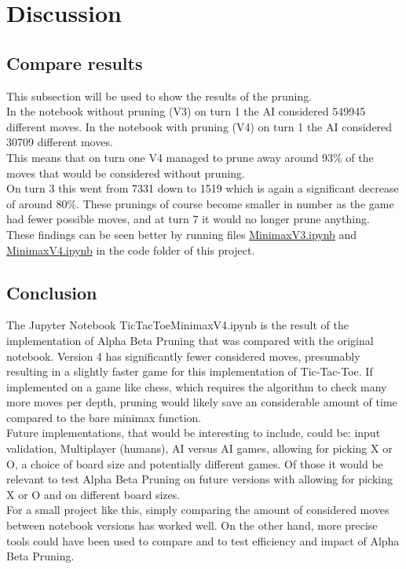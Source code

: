 \section{Discussion} 
\label{sec:Discussion}

\subsection{Compare results}
This subsection will be used to show the results of the pruning.\\
In the notebook without pruning (V3) on turn 1 the AI considered 549945 different moves.
In the notebook with pruning (V4) on turn 1 the AI considered 30709 different moves.\\
This means that on turn one V4 managed to prune away around 93\% of the moves that would be considered without pruning.\\
On turn 3 this went from 7331 down to 1519 which is again a significant decrease of around 80\%.
These prunings of course become smaller in number as the game had fewer possible moves, and at turn 7 it would no longer prune anything.\\
These findings can be seen better by running files \href{code/TicTacToe_MinimaxV3.ipynb}{MinimaxV3.ipynb} 
and \href{code/TicTacToe_MinimaxV4.ipynb}{MinimaxV4.ipynb} in the code folder of this project.

\subsection{Conclusion}
The Jupyter Notebook TicTacToe\textunderscore MinimaxV4.ipynb is the result of the implementation of 
Alpha Beta Pruning that was compared with the original notebook.
Version 4 has significantly fewer considered moves, presumably resulting in a slightly faster game 
for this implementation of Tic-Tac-Toe.
If implemented on a game like chess, which requires the algorithm to check many more moves per depth, 
pruning would likely save an considerable amount of time compared to the bare minimax function.\\
Future implementations, that would be interesting to include, could be: input validation, Multiplayer (humans), AI versus AI games, allowing for picking X or O, 
a choice of board size and potentially different games. Of those it would be relevant to test Alpha Beta Pruning on future versions 
with allowing for picking X or O and on different board sizes.\\
For a small project like this, simply comparing the amount of considered moves between notebook versions has worked well.
On the other hand, more precise tools could have been used to compare and to test efficiency and impact of Alpha Beta Pruning.